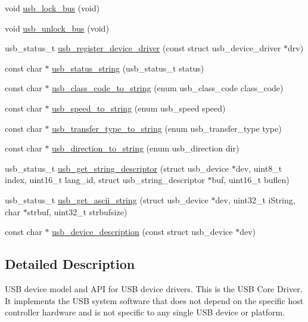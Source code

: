 \begin{DoxyCompactItemize}
void \hyperlink{group__usbcore_ga6b99d5980034f7f1f183218e609c801f}{usb\-\_\-lock\-\_\-bus} (void)
\item 
void \hyperlink{group__usbcore_gaf957391ad00401a906dbeb919183f56c}{usb\-\_\-unlock\-\_\-bus} (void)
\item 
usb\-\_\-status\-\_\-t \hyperlink{group__usbcore_ga33403372a738979110884fd1b3f4c474}{usb\-\_\-register\-\_\-device\-\_\-driver} (const struct usb\-\_\-device\-\_\-driver $\ast$drv)
\item 
const char $\ast$ \hyperlink{group__usbcore_gafe97aa2be2cc2aba482c64309cd7f88d}{usb\-\_\-status\-\_\-string} (usb\-\_\-status\-\_\-t status)
\item 
const char $\ast$ \hyperlink{group__usbcore_ga3609ee36c2101d9179594f7cfef176e9}{usb\-\_\-class\-\_\-code\-\_\-to\-\_\-string} (enum usb\-\_\-class\-\_\-code class\-\_\-code)
\item 
const char $\ast$ \hyperlink{group__usbcore_ga3fe8839660a728bd1bc378acd5e54ad6}{usb\-\_\-speed\-\_\-to\-\_\-string} (enum usb\-\_\-speed speed)
\item 
const char $\ast$ \hyperlink{group__usbcore_ga799108acda1af1559339b779bf11d201}{usb\-\_\-transfer\-\_\-type\-\_\-to\-\_\-string} (enum usb\-\_\-transfer\-\_\-type type)
\item 
const char $\ast$ \hyperlink{group__usbcore_gac86b850733f589f1d2c9443934cdaf8f}{usb\-\_\-direction\-\_\-to\-\_\-string} (enum usb\-\_\-direction dir)
\item 
usb\-\_\-status\-\_\-t \hyperlink{group__usbcore_ga46b81024db6dce7812618f41e288c1df}{usb\-\_\-get\-\_\-string\-\_\-descriptor} (struct usb\-\_\-device $\ast$dev, uint8\-\_\-t index, uint16\-\_\-t lang\-\_\-id, struct usb\-\_\-string\-\_\-descriptor $\ast$buf, uint16\-\_\-t buflen)
\item 
usb\-\_\-status\-\_\-t \hyperlink{group__usbcore_ga10ec2ced3150725518a49629137e68c7}{usb\-\_\-get\-\_\-ascii\-\_\-string} (struct usb\-\_\-device $\ast$dev, uint32\-\_\-t i\-String, char $\ast$strbuf, uint32\-\_\-t strbufsize)
\item 
const char $\ast$ \hyperlink{group__usbcore_gae30f9b5d46f045da04d6150e8d662763}{usb\-\_\-device\-\_\-description} (const struct usb\-\_\-device $\ast$dev)
\end{DoxyCompactItemize}


\subsection{Detailed Description}
U\-S\-B device model and A\-P\-I for U\-S\-B device drivers. This is the U\-S\-B Core Driver. It implements the U\-S\-B system software that does not depend on the specific host controller hardware and is not specific to any single U\-S\-B device or platform.

